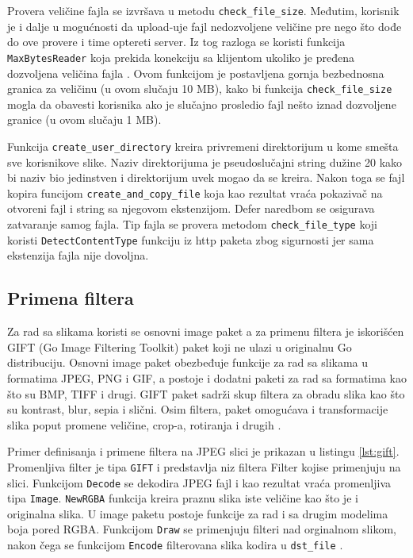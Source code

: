 \documentclass[12pt,oneside]{memoir}
\begin{document}
Provera veličine fajla se izvršava u metodu \texttt{check\_file\_size}. Međutim, korisnik je i dalje u mogućnosti da upload-uje fajl nedozvoljene veličine pre nego što dođe do ove provere i time optereti server. Iz tog razloga se koristi funkcija \texttt{MaxBytesReader} koja prekida konekciju sa klijentom ukoliko je pređena dozvoljena veličina fajla \cite{http}. Ovom funkcijom je postavljena gornja bezbednosna granica za veličinu (u ovom slučaju 10 MB), kako bi funkcija \texttt{check\_file\_size} mogla da obavesti korisnika ako je slučajno prosledio fajl nešto iznad dozvoljene granice (u ovom slučaju 1 MB). 

Funkcija \texttt{create\_user\_directory} kreira privremeni direktorijum u kome smešta sve korisnikove slike. Naziv direktorijuma je pseudoslučajni string dužine 20 kako bi naziv bio jedinstven i direktorijum uvek mogao da se kreira. Nakon toga se fajl kopira funcijom \texttt{create\_and\_copy\_file} koja kao rezultat vraća pokazivač na otvoreni fajl i string sa njegovom ekstenzijom. Defer naredbom se osigurava zatvaranje samog fajla. Tip fajla se provera metodom  \texttt{check\_file\_type} koji koristi \texttt{DetectContentType} funkciju iz http paketa zbog sigurnosti jer sama ekstenzija fajla nije dovoljna.
 
\subsection{Primena filtera}

Za rad sa slikama koristi se osnovni image paket a za primenu filtera je iskorišćen GIFT (Go Image Filtering Toolkit) paket\cite{gift} koji ne ulazi u originalnu Go distribuciju. Osnovni image paket obezbeđuje funkcije za rad sa slikama u formatima JPEG, PNG i GIF, a postoje i dodatni paketi za rad sa formatima kao što su BMP, TIFF i drugi\cite{image}. GIFT paket sadrži skup filtera za obradu slika kao što su kontrast, blur, sepia i slični. Osim filtera, paket omogućava i transformacije slika poput promene veličine, crop-a, rotiranja i drugih \cite{gift}.

Primer definisanja i primene filtera na JPEG slici je prikazan u listingu \ref{lst:gift}. Promenljiva filter je tipa  \texttt{GIFT} i predstavlja niz filtera Filter kojise primenjuju na slici. Funkcijom  \texttt{Decode} se dekodira JPEG fajl i kao rezultat vraća promenljiva tipa  \texttt{Image}.  \texttt{NewRGBA} funkcija kreira praznu slika iste veličine kao što je i originalna slika. U image paketu postoje funkcije za rad i sa drugim modelima boja pored RGBA. Funkcijom  \texttt{Draw} se primenjuju filteri nad orginalnom slikom, nakon čega se funkcijom  \texttt{Encode} filterovana slika kodira u  \texttt{dst\_file} \cite{gift}.
\end{document}
